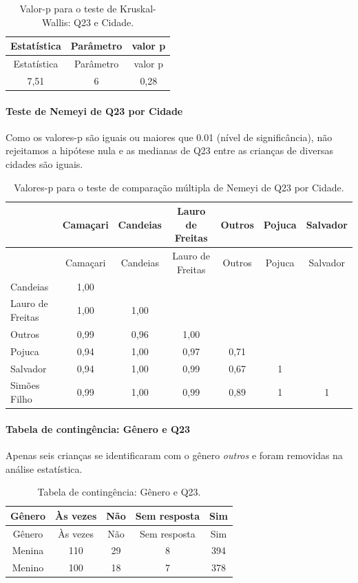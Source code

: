 \documentclass[]{article}
\let\oldparagraph\paragraph
\renewcommand{\paragraph}[1]{\oldparagraph{#1}\mbox{}}
\begin{document}
\begin{longtable}[]{@{}ccc@{}}
\caption{\label{tab:unnamed-chunk-551}Valor-p para o teste de Kruskal-Wallis: Q23 e Cidade.}\tabularnewline
\toprule
Estatística & Parâmetro & valor p\tabularnewline
\midrule
\endfirsthead
\toprule
Estatística & Parâmetro & valor p\tabularnewline
\midrule
\endhead
7,51 & 6 & 0,28\tabularnewline
\bottomrule
\end{longtable}

\hypertarget{teste-de-nemeyi-de-q23-por-cidade}{%
\paragraph{Teste de Nemeyi de Q23 por Cidade}\label{teste-de-nemeyi-de-q23-por-cidade}}

Como os valores-p são iguais ou maiores que 0.01 (nível de significância), não rejeitamos a hipótese nula e as medianas de Q23 entre as crianças de diversas cidades são iguais.

\begin{longtable}[]{@{}lcccccc@{}}
\caption{\label{tab:unnamed-chunk-553}Valores-p para o teste de comparação múltipla de Nemeyi de Q23 por Cidade.}\tabularnewline
\toprule
& Camaçari & Candeias & Lauro de Freitas & Outros & Pojuca & Salvador\tabularnewline
\midrule
\endfirsthead
\toprule
& Camaçari & Candeias & Lauro de Freitas & Outros & Pojuca & Salvador\tabularnewline
\midrule
\endhead
Candeias & 1,00 & & & & &\tabularnewline
Lauro de Freitas & 1,00 & 1,00 & & & &\tabularnewline
Outros & 0,99 & 0,96 & 1,00 & & &\tabularnewline
Pojuca & 0,94 & 1,00 & 0,97 & 0,71 & &\tabularnewline
Salvador & 0,94 & 1,00 & 0,99 & 0,67 & 1 &\tabularnewline
Simões Filho & 0,99 & 1,00 & 0,99 & 0,89 & 1 & 1\tabularnewline
\bottomrule
\end{longtable}

\cleardoublepage

\hypertarget{tabela-de-continguxeancia-guxeanero-e-q23}{%
\paragraph{Tabela de contingência: Gênero e Q23}\label{tabela-de-continguxeancia-guxeanero-e-q23}}

Apenas seis crianças se identificaram com o gênero \emph{outros} e foram removidas na análise estatística.

\begin{longtable}[]{@{}ccccc@{}}
\caption{\label{tab:unnamed-chunk-554}Tabela de contingência: Gênero e Q23.}\tabularnewline
\toprule
Gênero & Às vezes & Não & Sem resposta & Sim\tabularnewline
\midrule
\endfirsthead
\toprule
Gênero & Às vezes & Não & Sem resposta & Sim\tabularnewline
\midrule
\endhead
Menina & 110 & 29 & 8 & 394\tabularnewline
Menino & 100 & 18 & 7 & 378\tabularnewline
\bottomrule
\end{longtable}
\end{document}

